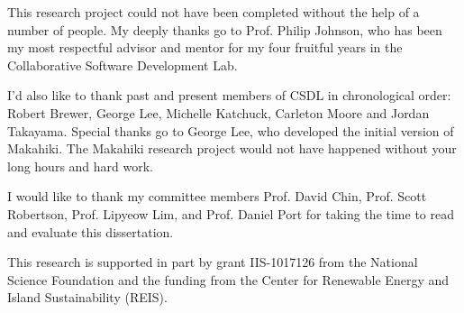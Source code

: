 \begin{acknowledgments}

This research project could not have been completed without the help of a number of people. My deeply thanks go to Prof. Philip Johnson, who has been my most respectful advisor and mentor for my four fruitful years in the Collaborative Software Development Lab. 
  
I'd also like to thank past and present members of CSDL in chronological order: Robert Brewer, George Lee, Michelle Kat\-chuck, Carleton Moore and Jordan Takayama. Special thanks go to George Lee, who developed the initial version of Makahiki. The Makahiki research project would not have happened without your long hours and hard work.

I would like to thank my committee members Prof. David Chin, Prof. Scott Robertson, Prof. Lipyeow Lim, and Prof. Daniel Port for taking the time to read and evaluate this dissertation.

This research is supported in part by grant IIS-1017126 from the National Science Foundation and the funding from the Center for Renewable Energy and Island Sustainability (REIS).

\end{acknowledgments}
